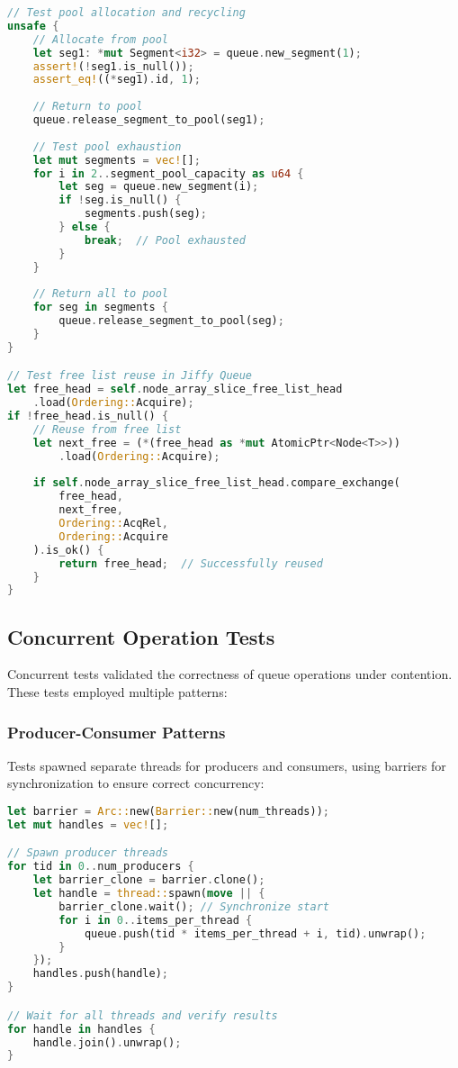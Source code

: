 \begin{lstlisting}[language=Rust, style=boxed, caption={Memory pool management test}, label={lst:pool-management-test}]
// Test pool allocation and recycling
unsafe {
    // Allocate from pool
    let seg1: *mut Segment<i32> = queue.new_segment(1);
    assert!(!seg1.is_null());
    assert_eq!((*seg1).id, 1);
    
    // Return to pool
    queue.release_segment_to_pool(seg1);
    
    // Test pool exhaustion
    let mut segments = vec![];
    for i in 2..segment_pool_capacity as u64 {
        let seg = queue.new_segment(i);
        if !seg.is_null() {
            segments.push(seg);
        } else {
            break;  // Pool exhausted
        }
    }
    
    // Return all to pool
    for seg in segments {
        queue.release_segment_to_pool(seg);
    }
}

// Test free list reuse in Jiffy Queue
let free_head = self.node_array_slice_free_list_head
    .load(Ordering::Acquire);
if !free_head.is_null() {
    // Reuse from free list
    let next_free = (*(free_head as *mut AtomicPtr<Node<T>>))
        .load(Ordering::Acquire);
        
    if self.node_array_slice_free_list_head.compare_exchange(
        free_head, 
        next_free, 
        Ordering::AcqRel, 
        Ordering::Acquire
    ).is_ok() {
        return free_head;  // Successfully reused
    }
}
\end{lstlisting}


\subsection{Concurrent Operation Tests}
Concurrent tests validated the correctness of queue operations under contention. These tests employed multiple patterns:

\subsubsection{Producer-Consumer Patterns}
Tests spawned separate threads for producers and consumers, using barriers for synchronization to ensure correct concurrency:

\begin{lstlisting}[language=Rust, style=boxed, caption={Concurrent test pattern}, label={lst:concurrent-test}]
let barrier = Arc::new(Barrier::new(num_threads));
let mut handles = vec![];

// Spawn producer threads
for tid in 0..num_producers {
    let barrier_clone = barrier.clone();
    let handle = thread::spawn(move || {
        barrier_clone.wait(); // Synchronize start
        for i in 0..items_per_thread {
            queue.push(tid * items_per_thread + i, tid).unwrap();
        }
    });
    handles.push(handle);
}

// Wait for all threads and verify results
for handle in handles {
    handle.join().unwrap();
}
\end{lstlisting}

